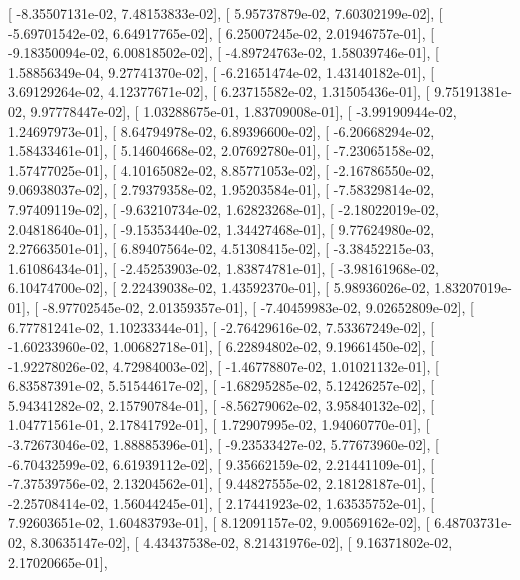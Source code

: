 \documentclass{article}
\begin{document}
       [ -8.35507131e-02,   7.48153833e-02],
       [  5.95737879e-02,   7.60302199e-02],
       [ -5.69701542e-02,   6.64917765e-02],
       [  6.25007245e-02,   2.01946757e-01],
       [ -9.18350094e-02,   6.00818502e-02],
       [ -4.89724763e-02,   1.58039746e-01],
       [  1.58856349e-04,   9.27741370e-02],
       [ -6.21651474e-02,   1.43140182e-01],
       [  3.69129264e-02,   4.12377671e-02],
       [  6.23715582e-02,   1.31505436e-01],
       [  9.75191381e-02,   9.97778447e-02],
       [  1.03288675e-01,   1.83709008e-01],
       [ -3.99190944e-02,   1.24697973e-01],
       [  8.64794978e-02,   6.89396600e-02],
       [ -6.20668294e-02,   1.58433461e-01],
       [  5.14604668e-02,   2.07692780e-01],
       [ -7.23065158e-02,   1.57477025e-01],
       [  4.10165082e-02,   8.85771053e-02],
       [ -2.16786550e-02,   9.06938037e-02],
       [  2.79379358e-02,   1.95203584e-01],
       [ -7.58329814e-02,   7.97409119e-02],
       [ -9.63210734e-02,   1.62823268e-01],
       [ -2.18022019e-02,   2.04818640e-01],
       [ -9.15353440e-02,   1.34427468e-01],
       [  9.77624980e-02,   2.27663501e-01],
       [  6.89407564e-02,   4.51308415e-02],
       [ -3.38452215e-03,   1.61086434e-01],
       [ -2.45253903e-02,   1.83874781e-01],
       [ -3.98161968e-02,   6.10474700e-02],
       [  2.22439038e-02,   1.43592370e-01],
       [  5.98936026e-02,   1.83207019e-01],
       [ -8.97702545e-02,   2.01359357e-01],
       [ -7.40459983e-02,   9.02652809e-02],
       [  6.77781241e-02,   1.10233344e-01],
       [ -2.76429616e-02,   7.53367249e-02],
       [ -1.60233960e-02,   1.00682718e-01],
       [  6.22894802e-02,   9.19661450e-02],
       [ -1.92278026e-02,   4.72984003e-02],
       [ -1.46778807e-02,   1.01021132e-01],
       [  6.83587391e-02,   5.51544617e-02],
       [ -1.68295285e-02,   5.12426257e-02],
       [  5.94341282e-02,   2.15790784e-01],
       [ -8.56279062e-02,   3.95840132e-02],
       [  1.04771561e-01,   2.17841792e-01],
       [  1.72907995e-02,   1.94060770e-01],
       [ -3.72673046e-02,   1.88885396e-01],
       [ -9.23533427e-02,   5.77673960e-02],
       [ -6.70432599e-02,   6.61939112e-02],
       [  9.35662159e-02,   2.21441109e-01],
       [ -7.37539756e-02,   2.13204562e-01],
       [  9.44827555e-02,   2.18128187e-01],
       [ -2.25708414e-02,   1.56044245e-01],
       [  2.17441923e-02,   1.63535752e-01],
       [  7.92603651e-02,   1.60483793e-01],
       [  8.12091157e-02,   9.00569162e-02],
       [  6.48703731e-02,   8.30635147e-02],
       [  4.43437538e-02,   8.21431976e-02],
       [  9.16371802e-02,   2.17020665e-01],
\end{document}
